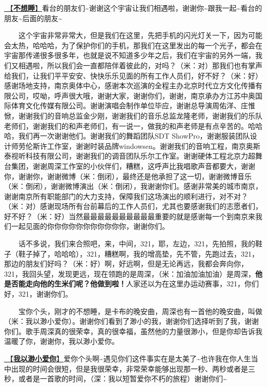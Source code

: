 \documentclass[]{ctexbook}
\begin{document}
\hyperref[keep-playing]{🎵【\textbf{不想睡}】}看台的朋友们\textasciitilde 谢谢这个宇宙让我们相遇啦，谢谢你\textasciitilde 跟我一起\textasciitilde 看台的朋友\textasciitilde 后面的朋友\textasciitilde{}

  这个宇宙非常非常大，但是我们在这里，先把手机的闪光灯关一下，因为可能会太热，哈哈哈，为了保护你们的手机，那我们在这里发出的每一个光子，都会在宇宙那传递很多很多年，也就是说不知道多少年之后，我们在宇宙的另外一端，我们又相遇啦，所以我们会一直都陪伴着彼此的，对吗？（米：对）那我们也有掌声给我们，让我们平平安安、快快乐乐见面的所有工作人员们，好不好？（米：好）感谢场地支持，南京奥体中心，感谢本次巡演的全程主办北京时代立方文化传播有限公司，哎呦，呼声很大哦，谢谢大家，谢谢你们，谢谢，南京承办方江苏中奥国际体育文化传媒有限公司。谢谢演唱会制作单位毕应，谢谢总导演周佑洋、庄惟惞，谢谢我们的音响总监金少刚，谢谢我们的音乐总监龙隆老师，谢谢我们的乐队老师们，谢谢我们的和声老师们，有一说一，做我的和声老师是有点辛苦的。哈哈哈，我们再一次谢谢他们。谢谢我们的舞蹈团队SDT ShowPro，谢谢服装团队设计师劳伦斯许工作室，谢谢时装品牌windowsen。谢谢我们的音响工程，南京奥斯泰视听科技有限公司，谢谢我们的调音团队乐尔工作室。谢谢硬体工程北京力超舞台集团，谢谢周深工作室的小伙伴们，糟糕，这呼声比我唱歌声音都要大，谢谢你，谢谢你，谢谢微博（米：倒闭），最终还是他承担了这一切，谢谢微博音乐（米：倒闭），谢谢微博演出（米：倒闭），我谢谢你们。感谢非常美的城市南京，谢谢南京所有职能部门的大力支持，保障我们这场演出的顺利进行，对不对？（米：对）感谢现场所有台前幕后的工作人员们，尤其也要感谢我们的志愿者们，好不好？（米：好）当然最最最最最最最最最最重要的就是感谢每一个到南京来我们一起见面的你你你你你你你你你你你，谢谢你们。

  话不多说，我们来合照吧，来，中间，321，耶，左边，321，先拍照，我的鞋子（鞋子掉了，哈哈哈），321，糟糕啊，我的增高垫，先不管，先跑过去，321，那边的朋友们好吗？（米：好）啊，好远啊，但是无论再远，我都会奔向你，321，我回头望，发现更远，现在领跑的是周深，（米：加油加油加油）是周深，\textbf{他是否能走向他的生米们呢？他做到啦！}人家还以为在这里办运动赛事，321，你们好，321，谢谢你们。

  宝你个头，刚才的不想睡，是卡布的晚安曲，周深也有一首他的晚安曲，叫做（米：我以渺小爱你）。谢谢你们看到了渺小的我，谢谢你们选择听到了我，谢谢你们。歌手周深真的很荣幸，真的很幸福，虽然他的力量很渺小，但是你却告诉我温暖了你，谢谢你，我以渺小爱你。

\hyperref[loving-you-in-my-humble-way]{🎵【\textbf{我以渺小爱你}】}爱你个头啊\textasciitilde 遇见你们这件事实在是太美了\textasciitilde 也许我在你人生当中出现的时间会很短，但是我很荣幸，非常荣幸能够出现那一秒、两秒或者是三秒，或者是一首歌的时间，（深：我以短暂爱你不朽的旅程）谢谢你们\textasciitilde{}
\end{document}
